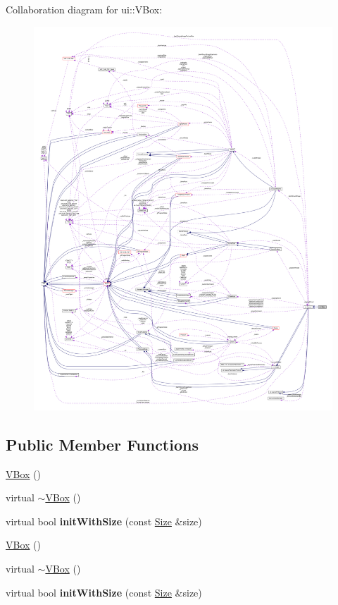 Collaboration diagram for ui\+:\+:V\+Box\+:
\nopagebreak
\begin{figure}[H]
\begin{center}
\leavevmode
\includegraphics[width=350pt]{classui_1_1VBox__coll__graph}
\end{center}
\end{figure}
\subsection*{Public Member Functions}
\begin{DoxyCompactItemize}
\item 
\hyperlink{classui_1_1VBox_a7aadb18ab5624f959f0ee49be744393f}{V\+Box} ()
\item 
virtual \hyperlink{classui_1_1VBox_a8717e2ea242504ad7a2b2a15c6fc11ce}{$\sim$\+V\+Box} ()
\item 
\mbox{\label{classui_1_1VBox_a6e2b6176affabad3cd8c6ef0f8ff23a8}} 
virtual bool {\bfseries init\+With\+Size} (const \hyperlink{classSize}{Size} \&size)
\item 
\hyperlink{classui_1_1VBox_a7aadb18ab5624f959f0ee49be744393f}{V\+Box} ()
\item 
virtual \hyperlink{classui_1_1VBox_ad8be1428759c3fb3b4d1d2def853b935}{$\sim$\+V\+Box} ()
\item 
\mbox{\label{classui_1_1VBox_a934c16961e52c153a49b5ba87fabf33e}} 
virtual bool {\bfseries init\+With\+Size} (const \hyperlink{classSize}{Size} \&size)
\end{DoxyCompactItemize}
